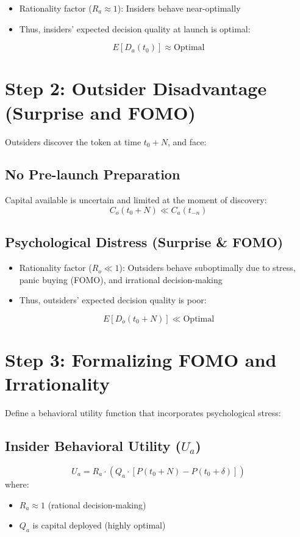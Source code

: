 \documentclass{article}
\begin{document}
\begin{itemize}
    \item Rationality factor ($R_a \approx 1$): Insiders behave near-optimally
    \item Thus, insiders' expected decision quality at launch is optimal:
\end{itemize}
\[
E[D_a(t_0)] \approx \text{Optimal}
\]

\section{Step 2: Outsider Disadvantage (Surprise and FOMO)}

Outsiders discover the token at time $t_0 + N$, and face:

\subsection*{No Pre-launch Preparation}

Capital available is uncertain and limited at the moment of discovery:
\[
C_o(t_0 + N) \ll C_a(t_{-n})
\]

\subsection*{Psychological Distress (Surprise & FOMO)}

\begin{itemize}
    \item Rationality factor ($R_o \ll 1$): Outsiders behave suboptimally due to stress, panic buying (FOMO), and irrational decision-making
    \item Thus, outsiders' expected decision quality is poor:
\end{itemize}
\[
E[D_o(t_0 + N)] \ll \text{Optimal}
\]

\section{Step 3: Formalizing FOMO and Irrationality}

Define a behavioral utility function that incorporates psychological stress:

\subsection*{Insider Behavioral Utility ($U_a$)}
\[
U_a = R_a \cdot (Q_a \cdot [P(t_0 + N) - P(t_0 + \delta)])
\]
where:
\begin{itemize}
    \item $R_a \approx 1$ (rational decision-making)
    \item $Q_a$ is capital deployed (highly optimal)
\end{itemize}
\end{document}
